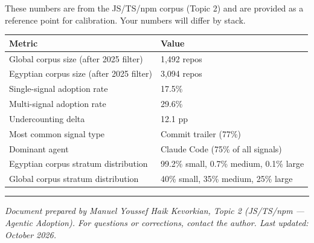 \documentclass[11pt,a4paper]{article}
\begin{document}
These numbers are from the JS/TS/npm corpus (Topic 2) and are provided as a reference point for calibration. Your numbers will differ by stack.

\begin{center}
\begin{tabular}{ll}
\toprule
\textbf{Metric} & \textbf{Value} \\
\midrule
Global corpus size (after 2025 filter) & 1,492 repos \\
Egyptian corpus size (after 2025 filter) & 3,094 repos \\
Single-signal adoption rate & 17.5\% \\
Multi-signal adoption rate & 29.6\% \\
Undercounting delta & 12.1 pp \\
\midrule
Most common signal type & Commit trailer (77\%) \\
Dominant agent & Claude Code (75\% of all signals) \\
\midrule
Egyptian corpus stratum distribution & 99.2\% small, 0.7\% medium, 0.1\% large \\
Global corpus stratum distribution & 40\% small, 35\% medium, 25\% large \\
\bottomrule
\end{tabular}
\end{center}

\vspace{2em}
\hrule
\vspace{0.5em}
\small\textit{Document prepared by Manuel Youssef Haik Kevorkian, Topic 2 (JS/TS/npm — Agentic Adoption). For questions or corrections, contact the author. Last updated: October 2026.}
\end{document}
